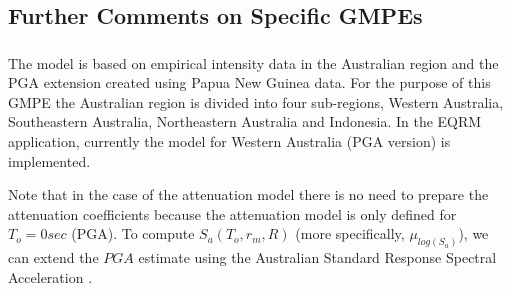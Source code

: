 \subsection{Further Comments on Specific GMPEs}

\subsubsection{\citet{eqrm_Gaull90a}}
The \citet{eqrm_Gaull90a} model is based on empirical intensity data
in the Australian region and the PGA extension created using Papua
New Guinea data. For the purpose of this GMPE the Australian region
is divided into four sub-regions, Western Australia, Southeastern
Australia, Northeastern Australia and Indonesia. In the EQRM
application, currently the model for Western Australia (PGA version)
is implemented.

Note that in the case of the \citet{eqrm_Gaull90a} attenuation model
there is no need to prepare the attenuation coefficients because the
attenuation model is only defined for $T_o=0 sec$ (PGA). To compute
$S_a(T_o,r_m,R)$ (more specifically, $\mu_{log(S_a)}$), we can
extend the $PGA$ estimate using the Australian Standard Response
Spectral Acceleration \citep{eqrm_Aus93}.

